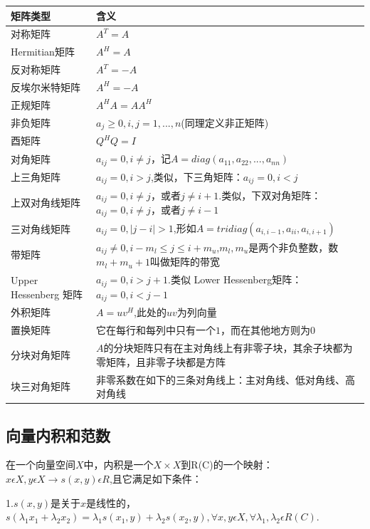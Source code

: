 \documentclass{article}
\begin{document}
\begin{tabular}{ |l|l| }   
\hline   
矩阵类型 & 含义\\
\hline
对称矩阵 & $A^T=A$ \\
\hline
Hermitian矩阵 & $A^H=A$ \\
\hline
反对称矩阵 & $A^T=-A$ \\
\hline
反埃尔米特矩阵 &  $A^H=-A$ \\
\hline
正规矩阵 &  $A^HA=AA^H$ \\
\hline
非负矩阵 & $a_{j}\ge 0,i,j=1,...,n$(同理定义非正矩阵) \\
\hline
酉矩阵 & $Q^HQ=I$ \\
\hline 
对角矩阵 & $a_{ij}=0,i\neq j$，记$A=diag(a_{11},a_{22},...,a_{nn})$ \\
\hline
上三角矩阵 & $a_{ij}=0,i>j$,类似，下三角矩阵：$a_{ij}=0,i<j$ \\
\hline
上双对角线矩阵 & $a_{ij}=0,i\neq j$，或者$j\neq i+1$.类似，下双对角矩阵：$a_{ij}=0,i\neq j$，或者$j\neq i-1$ \\
\hline 
三对角线矩阵 & $a_{ij}=0,|j-i|>1$,形如$A=tridiag(a_{i,i-1},a_{ii},a_{i,i+1})$ \\
\hline
带矩阵 & $a_{ij}\neq 0,i-m_l\leqslant j\leqslant i+m_u$,$m_l,m_u$是两个非负整数，数$m_l+m_u+1$叫做矩阵的带宽 \\
\hline
Upper Hessenberg 矩阵 & $a_{ij}=0,i>j+1$.类似 Lower Hessenberg矩阵：$a_{ij}=0,i<j-1$ \\
\hline 
外积矩阵 & $A=uv^H$,此处的$uv$为列向量 \\
\hline
置换矩阵 &它在每行和每列中只有一个$1$，而在其他地方则为$0$ \\
\hline
分块对角矩阵 & $A$的分块矩阵只有在主对角线上有非零子块，其余子块都为零矩阵，且非零子块都是方阵 \\
\hline
块三对角矩阵 & 非零系数在如下的三条对角线上：主对角线、低对角线、高对角线 \\
\hline
\end{tabular}


\subsection{向量内积和范数}
在一个向量空间$X$中，内积是一个$X\times X$到R(C)的一个映射：$x\epsilon X,y\epsilon X \longrightarrow s(x,y)\epsilon R $,且它满足如下条件：

1.$s(x,y)$是关于$x$是线性的，$s(\lambda _1 x_1+\lambda _2 x_2)=\lambda _1 s(x_1,y)+\lambda _2 s(x_2,y),\forall x,y\epsilon X,\forall \lambda _1 ,\lambda _2 \epsilon R(C)$.
\end{document}

